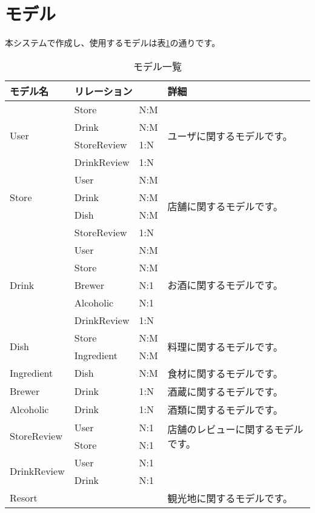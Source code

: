 \documentclass[a4j,titlepage]{jarticle}
\begin{document}
\section{モデル}

本システムで作成し、使用するモデルは表\ref{model}の通りです。

\begin{table}[!htbp]
\caption{モデル一覧}
\label{model}
\small
\begin{center}
\begin{tabular}{|l|l|l|p{5cm}|}\hline
モデル名 & \multicolumn{2}{|l|}{リレーション} & 詳細 \\\hline\hline
\multirow{4}{*}{User} & Store & N:M & \multirow{4}{*}{ユーザに関するモデルです。}\\\cline{2-3}
 & Drink & N:M & \\\cline{2-3}
 & StoreReview & 1:N & \\\cline{2-3}
 & DrinkReview & 1:N & \\\hline
\multirow{3}{*}{Store} & User & N:M & \multirow{4}{*}{店舗に関するモデルです。} \\\cline{2-3}
 & Drink & N:M & \\\cline{2-3}
 & Dish & N:M & \\\cline{2-3}
 & StoreReview & 1:N & \\\hline
\multirow{5}{*}{Drink} & User & N:M & \multirow{5}{*}{お酒に関するモデルです。} \\\cline{2-3}
 & Store & N:M & \\\cline{2-3}
 & Brewer & N:1 & \\\cline{2-3}
 & Alcoholic & N:1 & \\\cline{2-3}
 & DrinkReview & 1:N & \\\hline
\multirow{2}{*}{Dish} & Store & N:M & \multirow{2}{*}{料理に関するモデルです。} \\\cline{2-3}
 & Ingredient & N:M & \\\hline
Ingredient & Dish & N:M & 食材に関するモデルです。 \\\hline
Brewer & Drink & 1:N & 酒蔵に関するモデルです。 \\\hline
Alcoholic & Drink & 1:N & 酒類に関するモデルです。 \\\hline
\multirow{2}{*}{StoreReview} & User & N:1 & \multirow{2}{*}{店舗のレビューに関するモデルです。} \\\cline{2-3}
 & Store & N:1 & \\\hline
\multirow{2}{*}{DrinkReview} & User & N:1
\multirow{2}{*}{お酒のレビューに関するモデルです。} \\\cline{2-3}
 & Drink & N:1 & \\\hline
Resort & & & 観光地に関するモデルです。 \\\hline
\end{tabular}
\end{center}
\end{table}
\end{document}
